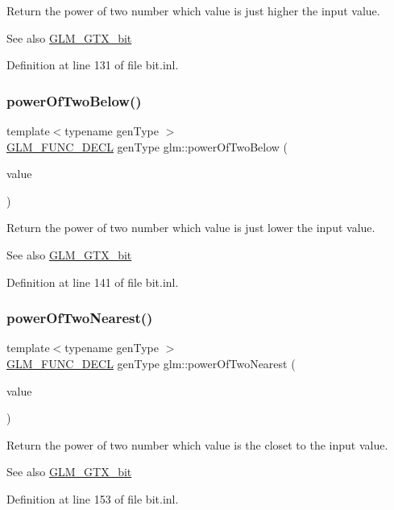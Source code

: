Return the power of two number which value is just higher the input value. \begin{DoxySeeAlso}{See also}
\hyperlink{group__gtx__bit}{G\+L\+M\+\_\+\+G\+T\+X\+\_\+bit} 
\end{DoxySeeAlso}


Definition at line 131 of file bit.\+inl.

\mbox{\label{group__gtx__bit_gaeceaea338213cbff7a275460e35e8d0c}} 
\subsubsection{\texorpdfstring{power\+Of\+Two\+Below()}{powerOfTwoBelow()}}
{\footnotesize\ttfamily template$<$typename gen\+Type $>$ \\
\hyperlink{setup_8hpp_ab2d052de21a70539923e9bcbf6e83a51}{G\+L\+M\+\_\+\+F\+U\+N\+C\+\_\+\+D\+E\+CL} gen\+Type glm\+::power\+Of\+Two\+Below (\begin{DoxyParamCaption}\item[{gen\+Type const \&}]{value }\end{DoxyParamCaption})}

Return the power of two number which value is just lower the input value. \begin{DoxySeeAlso}{See also}
\hyperlink{group__gtx__bit}{G\+L\+M\+\_\+\+G\+T\+X\+\_\+bit} 
\end{DoxySeeAlso}


Definition at line 141 of file bit.\+inl.

\mbox{\label{group__gtx__bit_ga9e68299f4ca0cd6674efbee62d425b95}} 
\subsubsection{\texorpdfstring{power\+Of\+Two\+Nearest()}{powerOfTwoNearest()}}
{\footnotesize\ttfamily template$<$typename gen\+Type $>$ \\
\hyperlink{setup_8hpp_ab2d052de21a70539923e9bcbf6e83a51}{G\+L\+M\+\_\+\+F\+U\+N\+C\+\_\+\+D\+E\+CL} gen\+Type glm\+::power\+Of\+Two\+Nearest (\begin{DoxyParamCaption}\item[{gen\+Type const \&}]{value }\end{DoxyParamCaption})}

Return the power of two number which value is the closet to the input value. \begin{DoxySeeAlso}{See also}
\hyperlink{group__gtx__bit}{G\+L\+M\+\_\+\+G\+T\+X\+\_\+bit} 
\end{DoxySeeAlso}


Definition at line 153 of file bit.\+inl.


